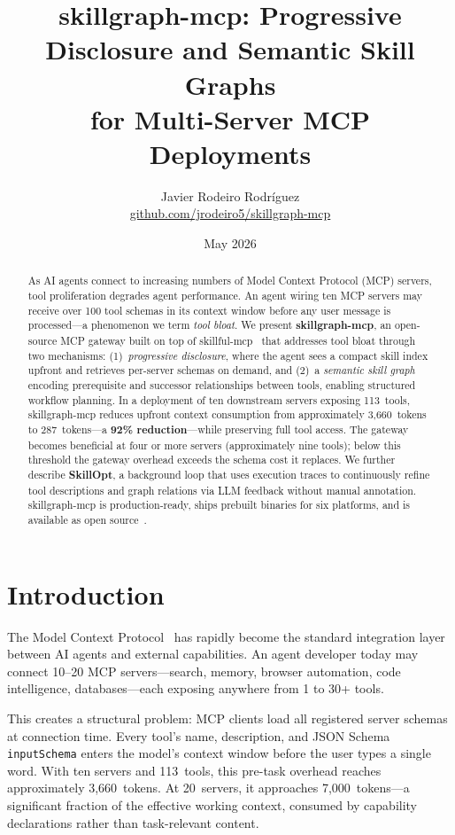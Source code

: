 \documentclass[11pt,a4paper]{article}
\title{\textbf{skillgraph-mcp}: Progressive Disclosure and Semantic Skill Graphs\\
       for Multi-Server MCP Deployments}
\author{
  Javier Rodeiro Rodr\'iguez \\
  \href{https://github.com/jrodeiro5/skillgraph-mcp}{github.com/jrodeiro5/skillgraph-mcp}
}
\date{May 2026}
\begin{document}
\maketitle

\begin{abstract}
As AI agents connect to increasing numbers of Model Context Protocol (MCP) servers,
tool proliferation degrades agent performance. An agent wiring ten MCP servers may
receive over 100 tool schemas in its context window before any user message is
processed---a phenomenon we term \emph{tool bloat}. We present \textbf{skillgraph-mcp},
an open-source MCP gateway built on top of skillful-mcp~\cite{skillful2026} that addresses
tool bloat through two mechanisms: (1)~\emph{progressive disclosure}, where the agent sees
a compact skill index upfront and retrieves per-server schemas on demand, and
(2)~a \emph{semantic skill graph} encoding prerequisite and successor relationships
between tools, enabling structured workflow planning. In a deployment of ten downstream
servers exposing 113~tools, skillgraph-mcp reduces upfront context consumption from
approximately 3,660~tokens to 287~tokens---a \textbf{92\% reduction}---while preserving
full tool access. The gateway becomes beneficial at four or more servers (approximately
nine tools); below this threshold the gateway overhead exceeds the schema cost it
replaces. We further describe \textbf{SkillOpt}, a background loop that uses execution
traces to continuously refine tool descriptions and graph relations via LLM feedback
without manual annotation. skillgraph-mcp is production-ready, ships prebuilt binaries
for six platforms, and is available as open source~\cite{skillgraph2026}.
\end{abstract}

\section{Introduction}
\label{sec:intro}

The Model Context Protocol~\cite{mcp2024} has rapidly become the standard integration
layer between AI agents and external capabilities. An agent developer today may connect
10--20 MCP servers---search, memory, browser automation, code intelligence,
databases---each exposing anywhere from 1 to 30+ tools.

This creates a structural problem: MCP clients load all registered server schemas at
connection time. Every tool's name, description, and JSON Schema \texttt{inputSchema}
enters the model's context window before the user types a single word. With ten servers
and 113~tools, this pre-task overhead reaches approximately 3,660~tokens. At
20~servers, it approaches 7,000~tokens---a significant fraction of the effective
working context, consumed by capability declarations rather than task-relevant content.
\end{document}
